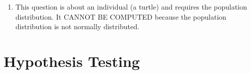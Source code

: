 \documentclass[10pt,openany]{book}\usepackage[]{graphicx}\usepackage[]{color}
\newenvironment{knitrout}{}{} %
\begin{document}
\begin{itemize}
\begin{enumerate}
\begin{knitrout}
{}



\end{knitrout}
       \item This question is about an individual (a turtle) and requires the population distribution. It CANNOT BE COMPUTED because the population distribution is not normally distributed.
    \end{enumerate}

\end{itemize}





\section*{Hypothesis Testing}
\end{document}
